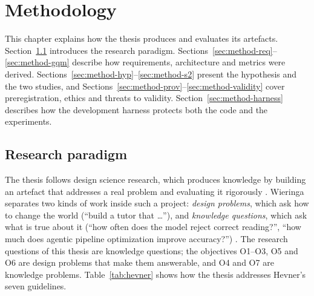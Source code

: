 \chapter{Methodology}\label{ch:method}

This chapter explains how the thesis produces and evaluates its artefacts. Section~\ref{sec:method-dsr}
introduces the research paradigm. Sections~\ref{sec:method-req}--\ref{sec:method-gqm} describe how
requirements, architecture and metrics were derived. Sections~\ref{sec:method-hyp}--\ref{sec:method-s2}
present the hypothesis and the two studies, and Sections~\ref{sec:method-prov}--\ref{sec:method-validity} cover
preregistration, ethics and threats to validity. Section~\ref{sec:method-harness} describes how the
development harness protects both the code and the experiments.

\section{Research paradigm}\label{sec:method-dsr}

The thesis follows design science research, which produces knowledge by building an artefact that
addresses a real problem and evaluating it rigorously \cite{SRC-100}. Wieringa separates two kinds of
work inside such a project: \emph{design problems}, which ask how to change the world (``build a tutor
that \ldots''), and \emph{knowledge questions}, which ask what is true about it (``how often does the model
reject correct reading?'', ``how much does agentic pipeline optimization improve accuracy?'') \cite{SRC-101}. The
research questions of this thesis are knowledge questions; the objectives O1--O3, O5 and O6 are design problems
that make them answerable, and O4 and O7 are knowledge problems. Table~\ref{tab:hevner} shows
how the thesis addresses Hevner's seven guidelines.

